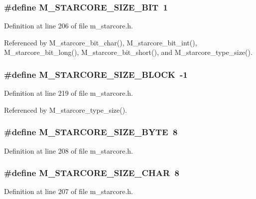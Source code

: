 \subsubsection{\setlength{\rightskip}{0pt plus 5cm}\#define M\_\-STARCORE\_\-SIZE\_\-BIT~1}\label{m__starcore_8h_d3558c6a1a9f1076562269826b0c4a65}




Definition at line 206 of file m\_\-starcore.h.

Referenced by M\_\-starcore\_\-bit\_\-char(), M\_\-starcore\_\-bit\_\-int(), M\_\-starcore\_\-bit\_\-long(), M\_\-starcore\_\-bit\_\-short(), and M\_\-starcore\_\-type\_\-size().
\subsubsection{\setlength{\rightskip}{0pt plus 5cm}\#define M\_\-STARCORE\_\-SIZE\_\-BLOCK~-1}\label{m__starcore_8h_7350c62be2724f775a383fd62945a946}




Definition at line 219 of file m\_\-starcore.h.

Referenced by M\_\-starcore\_\-type\_\-size().
\subsubsection{\setlength{\rightskip}{0pt plus 5cm}\#define M\_\-STARCORE\_\-SIZE\_\-BYTE~8}\label{m__starcore_8h_f02f0d34ab25fb7ef289b8d5056aa9ab}




Definition at line 208 of file m\_\-starcore.h.
\subsubsection{\setlength{\rightskip}{0pt plus 5cm}\#define M\_\-STARCORE\_\-SIZE\_\-CHAR~8}\label{m__starcore_8h_5b9ec3efb44072a1b29ac68de68c9e7b}




Definition at line 207 of file m\_\-starcore.h.

